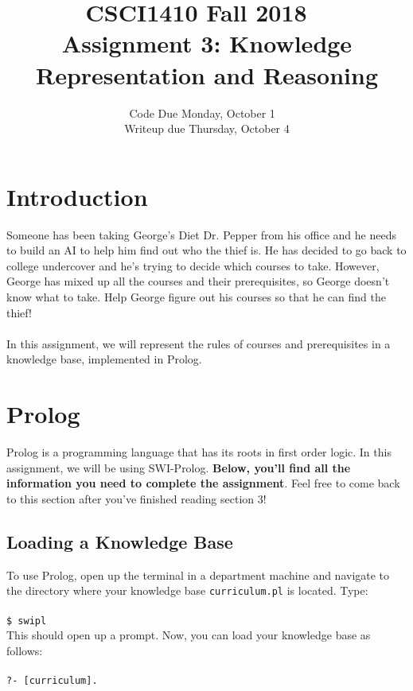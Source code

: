 \documentclass{article}
\title{CSCI1410 Fall 2018 ~\\
Assignment 3: Knowledge Representation and Reasoning}
\date{Code Due Monday, October 1 ~\\
Writeup due Thursday, October 4}
\begin{document}
\maketitle


\section{Introduction}
Someone has been taking George's Diet Dr. Pepper from his office and he needs to build an AI to help him find out who the thief is. He has decided to go back to college undercover and he's trying to decide which courses to take. However, George has mixed up all the courses and their prerequisites, so George doesn't know what to take. Help George figure out his courses so that he can find the thief!\\\\
In this assignment, we will represent the rules of courses and prerequisites in a knowledge base, implemented in Prolog.~


\section{Prolog}

Prolog is a programming language that has its roots in first order logic. In this assignment, we will be using SWI-Prolog. \textbf{Below, you'll find all the information you need to complete the assignment}. Feel free to come back to this section after you've finished reading section 3!\\
\subsection{Loading a Knowledge Base}
To use Prolog, open up the terminal in a department machine and navigate to the directory where your knowledge base \verb|curriculum.pl| is located. Type:\\\\
\verb|$ swipl|\\

This should open up a prompt. Now, you can load your knowledge base as follows:\\\\
\verb|?- [curriculum].|\\
\end{document}
